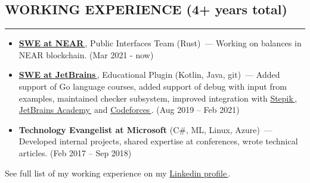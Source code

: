 \documentclass[11pt]{res} %
\let\orighref\href
\renewcommand{\href}[2]{\orighref{#1}{#2\,\faExternalLink}}
\begin{document}
\begin{resume}
\section{\uppercase{Working Experience} (4+ years total)}
\begin{spacing}{0.3}
\textcolor[RGB]{220,220,220}{\rule{\linewidth}{0.4pt}} 
\end{spacing}
\vspace{0.2in}
   \begin{itemize} \itemsep -2pt  %
   \item \textbf{\href{https://near.org}{SWE at NEAR}}, Public Interfaces Team (Rust)~--- Working on balances in NEAR blockchain. (Mar 2021 - now)
    \item \textbf{\href{https://github.com/JetBrains/educational-plugin}{SWE at JetBrains}}, Educational Plugin (Kotlin, Java, git)~--- Added support of Go language courses, added support of debug with input from examples, maintained checker subsystem, improved integration with \href{https://stepik.org/}{Stepik}, \href{https://hyperskill.org}{JetBrains Academy} and \href{http://codeforces.com}{Codeforces}. (Aug 2019 – Feb 2021)
   \item {\textbf{Technology Evangelist at Microsoft}} (C\#, ML, Linux, Azure)~--- Developed internal projects, shared expertise at conferences, wrote technical articles. (Feb 2017 – Sep 2018)
 \end{itemize}
 See full list of my working experience on my \href{https://www.linkedin.com/in/telezhnaya/}{Linkedin profile}.


\end{resume}
\end{document}
